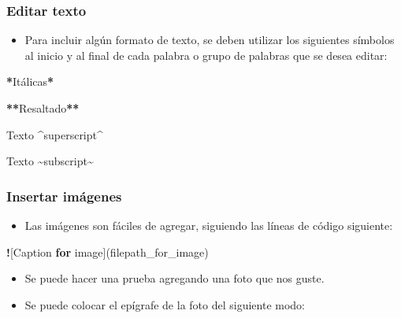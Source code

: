 \documentclass[
]{article}
\newenvironment{Shaded}{\begin{snugshade}}{\end{snugshade}}
\newcommand{\ControlFlowTok}[1]{\textcolor[rgb]{0.13,0.29,0.53}{\textbf{#1}}}
\newcommand{\ErrorTok}[1]{\textcolor[rgb]{0.64,0.00,0.00}{\textbf{#1}}}
\newcommand{\NormalTok}[1]{#1}
\newcommand{\SpecialCharTok}[1]{\textcolor[rgb]{0.81,0.36,0.00}{\textbf{#1}}}
\providecommand{\tightlist}{%
  \setlength{\itemsep}{0pt}\setlength{\parskip}{0pt}}
\begin{document}
\hypertarget{editar-texto}{%
\subsubsection{Editar texto}\label{editar-texto}}

\begin{itemize}
\tightlist
\item
  Para incluir algún formato de texto, se deben utilizar los siguientes símbolos al inicio y al final de cada palabra o grupo de palabras que se desea editar:
\end{itemize}

\begin{Shaded}
\begin{Highlighting}[]
\SpecialCharTok{*}\NormalTok{Itálicas}\SpecialCharTok{*}
    
\ErrorTok{**}\NormalTok{Resaltado}\SpecialCharTok{**}
    
\NormalTok{Texto }\SpecialCharTok{\^{}}\NormalTok{superscript}\SpecialCharTok{\^{}}
    
\NormalTok{Texto }\SpecialCharTok{\textasciitilde{}}\NormalTok{subscript}\SpecialCharTok{\textasciitilde{}}
\end{Highlighting}
\end{Shaded}

\hypertarget{insertar-imuxe1genes}{%
\subsubsection{Insertar imágenes}\label{insertar-imuxe1genes}}

\begin{itemize}
\tightlist
\item
  Las imágenes son fáciles de agregar, siguiendo las líneas de código siguiente:
\end{itemize}

\begin{Shaded}
\begin{Highlighting}[]
\SpecialCharTok{!}\NormalTok{[Caption }\ControlFlowTok{for}\NormalTok{ image](filepath\_for\_image)}
\end{Highlighting}
\end{Shaded}

\begin{itemize}
\item
  Se puede hacer una prueba agregando una foto que nos guste.
\item
  Se puede colocar el epígrafe de la foto del siguiente modo:
\end{itemize}
\end{document}
